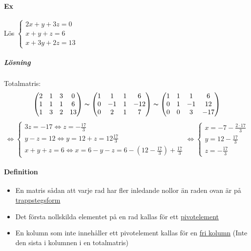 \paragraph{Ex} Lös $\begin{cases}2x+y+3z=0\\x+y+z=6\\x+3y+2z=13\end{cases}$
\subparagraph{Lösning} Totalmatris:
\begin{equation*}
    \begin{pmatrix}
        2&1&3&0\\1&1&1&6\\1&3&2&13
    \end{pmatrix}
    \thicksim
    \begin{pmatrix}
        1&1&1&6\\
        0&-1&1&-12\\
        0&2&1&7
    \end{pmatrix}
    \thicksim
    \begin{pmatrix}
        1&1&1&6\\
        0&1&-1&12\\
        0&0&3&-17
    \end{pmatrix}
\end{equation*}
\begin{equation*}
    \Leftrightarrow
    \begin{cases}
        3z=-17\Leftrightarrow z=-\frac{17}{3}\\
        y-z=12\Leftrightarrow y = 12+z= 12\frac{17}{3}\\
        x+y+z=6\Leftrightarrow x=6-y-z=6-(12-\frac{17}{3})+\frac{17}{3}
    \end{cases}
    \Leftrightarrow
    \begin{cases}
        x=-7-\frac{2\cdot 17}{3}\\
        y=12-\frac{17}{3}\\
        z=-\frac{17}{3}
    \end{cases}
\end{equation*}

\paragraph{Definition} 
\begin{itemize}
    \item En matris sådan att varje rad har fler inledande nollor än raden ovan är på \underline{trappstegsform}
    \item Det första nollskilda elementet på en rad kallas för ett \underline{pivotelement}
    \item En kolumn som inte innehåller ett pivotelement kallas för en \underline{fri kolumn} (Inte den sista i kolumnen i en totalmatris)
\end{itemize}

